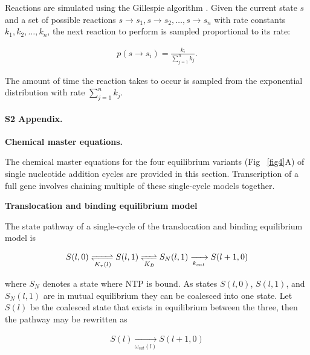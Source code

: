 \documentclass[10pt,letterpaper]{article}
\begin{document}
Reactions are simulated using the Gillespie algorithm \cite{gillespie1977exact}.  Given the current state $s$ and a set of possible reactions $s\rightarrow s_1, s\rightarrow s_2, \dotso, s\rightarrow s_n$ with rate constants $k_1, k_2, \dotso, k_n$, the next reaction to perform is sampled proportional to its rate:

\begin{eqnarray}
    p(s\rightarrow s_i) = \frac{k_i}{\sum\limits_{j=1}^n k_j}.
\end{eqnarray}

The amount of time the reaction takes to occur is sampled from the exponential distribution with rate $\sum\limits_{j=1}^n k_j$. \\








\paragraph*{S2 Appendix.}
\label{S2_Appendix}
\textbf{ Chemical master equations.}



The chemical master equations for the four equilibrium variants (Fig ~\ref{fig4}A) of single nucleotide addition cycles are provided in this section. Transcription of a full gene involves chaining multiple of these single-cycle models together.



\textbf{Translocation and binding equilibrium model} \par


The state pathway of a single-cycle of the translocation and binding equilibrium model is


\begin{eqnarray}
    S(l,0) \xrightleftharpoons[K_\tau(l)]{} S(l,1) \xrightleftharpoons[K_D]{} S_N(l,1) \xrightarrow[k_{cat}]{} S(l+1,0)
\end{eqnarray}


where $S_N$ denotes a state where NTP is bound. As states $S(l,0)$, $S(l,1)$, and $S_N(l,1)$ are in mutual equilibrium they can be coalesced into one state. Let $S(l)$ be the coalesced state that exists in equilibrium between the three, then the pathway may be rewritten as


\begin{eqnarray}
    S(l) \xrightarrow[\omega_{cat}(l)]{} S(l+1,0)
\end{eqnarray}
\end{document}
